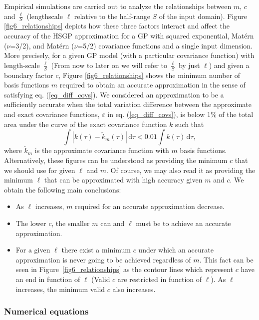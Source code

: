 Empirical simulations are carried out to analyze the relationships between $m$, $c$ and $\frac{\ell}{S}$ (lengthscale $\ell$ relative to the half-range $S$ of the input domain). Figure \ref{fig6_relationships} depicts how these three factors interact and affect the accuracy of the HSGP approximation for a GP with squared exponential, Mat\'ern ($\nu$=3/2), and Mat\'ern ($\nu$=5/2) covariance functions and a single input dimension. More precisely, for a given GP model (with a particular covariance function) with length-scale $\frac{\ell}{S}$ (From now to later on we will refer to $\frac{\ell}{S}$ by just $\ell$) and given a boundary factor $c$, Figure \ref{fig6_relationships} shows the minimum number of basis functions $m$ required to obtain an accurate approximation in the sense of satisfying eq. (\ref{eq_diff_covs}). We considered an approximation to be a sufficiently accurate when the total variation difference between the approximate and exact covariance functions, $\varepsilon$ in eq. (\ref{eq_diff_covs}), is below 1$\%$ of the total area under the curve of the exact covariance function $k$ such that
%
\begin{equation} \label{eq:rel_total_distance}
 \int | k(\tau) - \tilde{k}_m(\tau)|  \,\mathrm{d}\tau  < 0.01 \int k(\tau) \,\mathrm{d}\tau,
\end{equation}
%
where $\tilde{k}_m$ is the approximate covariance function with $m$ basis functions. Alternatively, these figures can be understood as providing the minimum $c$ that we should use for given $\ell$ and $m$. Of course, we may also read it as providing the minimum $\ell$ that can be approximated with high accuracy given $m$ and $c$. We obtain the following main conclusions:
%
\begin{itemize}
\item As $\ell$ increases, $m$ required for an accurate approximation decrease.
\item The lower $c$, the smaller $m$ can and $\ell$ must be to achieve an accurate approximation.
\item For a given $\ell$ there exist a minimum $c$ under which an accurate approximation is never going to be achieved regardless of $m$. This fact can be seen in Figure~\ref{fig6_relationships} as the contour lines which represent $c$ have an end in function of $\ell$ (Valid $c$ are restricted in function of $\ell$). As $\ell$ increases, the minimum valid $c$ also increases.
\end{itemize}

\subsubsection{Numerical equations}
\label{sec_num_equations}

